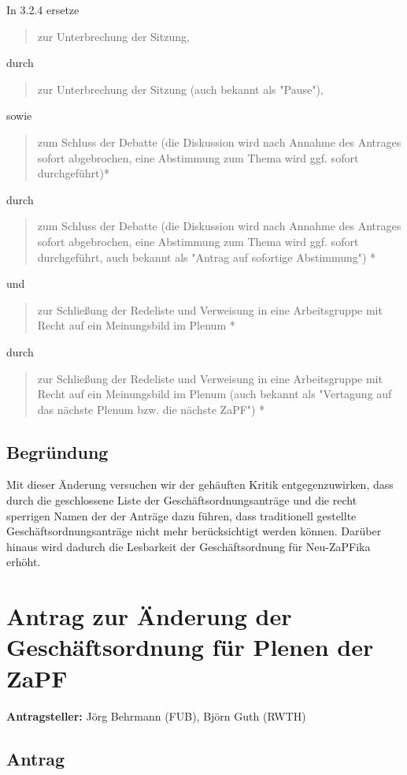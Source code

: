 \documentclass[draft,10pt,oneside]{scrartcl}
\begin{document}
In 3.2.4 ersetze
\begin{quote}
	zur Unterbrechung der Sitzung,
\end{quote}
durch
\begin{quote}
	zur Unterbrechung der Sitzung (auch bekannt als "Pause"),
\end{quote}
sowie
\begin{quote}
	zum Schluss der Debatte (die Diskussion wird nach Annahme des Antrages
	sofort abgebrochen, eine Abstimmung zum Thema wird ggf. sofort
	durchgeführt)*
\end{quote}
durch
\begin{quote}
	zum Schluss der Debatte (die Diskussion wird nach Annahme des Antrages
	sofort abgebrochen, eine Abstimmung zum Thema wird ggf. sofort
	durchgeführt, auch bekannt als "Antrag auf sofortige Abstimmung") *
\end{quote}
und
\begin{quote}
	zur Schließung der Redeliste und Verweisung in eine Arbeitsgruppe mit Recht
	auf ein Meinungsbild im Plenum *
\end{quote}
durch
\begin{quote}
	zur Schließung der Redeliste und Verweisung in eine Arbeitsgruppe mit Recht
	auf ein Meinungsbild im Plenum (auch bekannt als "Vertagung auf das nächste
	Plenum bzw. die nächste ZaPF") *
\end{quote}

\subsection*{Begründung}
Mit dieser Änderung versuchen wir der gehäuften Kritik entgegenzuwirken, dass
durch die geschlossene Liste der Geschäftsordnungsanträge und die recht
sperrigen Namen der der Anträge dazu führen, dass traditionell gestellte
Geschäftsordnungsanträge nicht mehr berücksichtigt werden können.
Darüber hinaus wird dadurch die Lesbarkeit der Geschäftsordnung für Neu-ZaPFika
erhöht.

\newpage

\section*{Antrag zur Änderung der Geschäftsordnung für Plenen der ZaPF}

\textbf{Antragsteller:} Jörg Behrmann (FUB), Björn Guth (RWTH)

\subsection*{Antrag}
\end{document}
